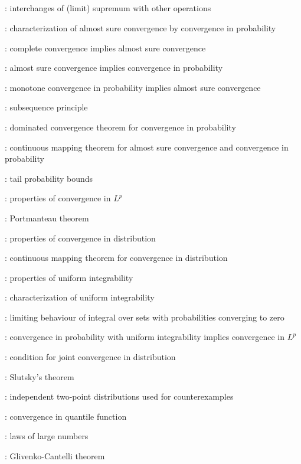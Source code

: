 \subsection*{}
\item {}: interchanges of (limit) supremum with other operations
\item {}: characterization of almost sure convergence by convergence in probability
\item {}: complete convergence implies almost sure convergence
\item {}: almost sure convergence implies convergence in probability
\item {}: monotone convergence in probability implies almost sure convergence
\item {}: subsequence principle
\item {}: dominated convergence theorem for convergence in probability
\item {}: continuous mapping theorem for almost sure convergence and convergence in probability
\item {}: tail probability bounds
\item {}: properties of convergence in \(L^p\)
\item {}: Portmanteau theorem
\item {}: properties of convergence in distribution
\item {}: continuous mapping theorem for convergence in distribution
\item {}: properties of uniform integrability
\item {}: characterization of uniform integrability
\item {}: limiting behaviour of integral over sets with probabilities converging to zero
\item {}: convergence in probability with uniform integrability implies convergence in \(L^p\)
\item {}: condition for joint convergence in distribution
\item {}: Slutsky's theorem
\item {}: independent two-point distributions used for counterexamples
\item {}: convergence in quantile function
\item {}: laws of large numbers
\item {}: Glivenko-Cantelli theorem
